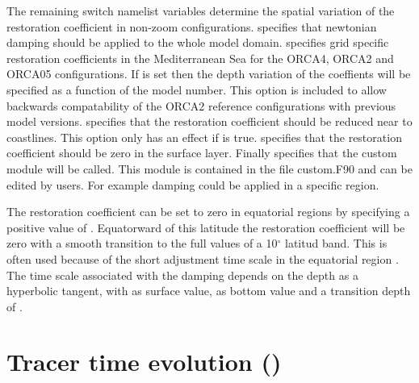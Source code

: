 The remaining switch namelist variables determine the spatial variation of the restoration coefficient in non-zoom configurations.  specifies that newtonian damping should be applied to the whole model domain.  specifies grid specific restoration coefficients in the Mediterranean Sea for the ORCA4, ORCA2 and ORCA05 configurations. If  is set then the depth variation of the coeffients will be specified as a function of the model number. This option is included to allow backwards compatability of the ORCA2 reference configurations with previous model versions.  specifies that the restoration coefficient should be reduced near to coastlines. This option only has an effect if  is true.  specifies that the restoration coefficient should be zero in the surface layer. Finally  specifies that the custom module will be called. This module is contained in the file custom.F90 and can be edited by users. For example damping could be applied in a specific region.

The restoration coefficient can be set to zero in equatorial regions by specifying a positive value of . Equatorward of this latitude the restoration coefficient will be zero with a smooth transition to the full values of a 10$^{\circ}$ latitud band. This is often used because of the short adjustment time scale in the equatorial region \citep{Reverdin1991, Fujio1991, Marti_PhD92}. The time scale associated with the damping depends on the depth as a hyperbolic tangent, with  as surface value,  as bottom value and a transition depth of .  

\section  [Tracer time evolution (\textit{tranxt})]
		{Tracer time evolution ()}
\label{TRA_nxt}

